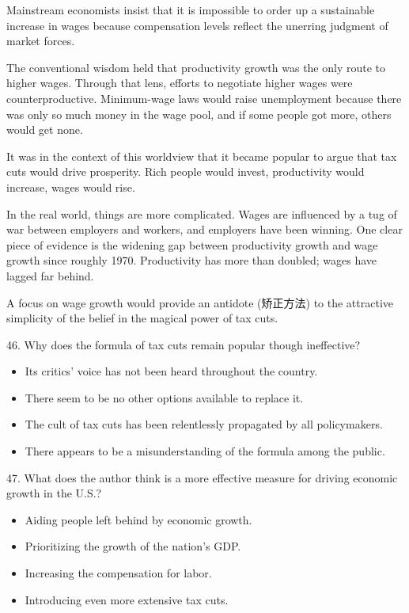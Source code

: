 \documentclass[UTF8,11pt]{ctexart}
\begin{document}
Mainstream economists insist that it is impossible to order up a sustainable increase in wages because compensation levels reflect the unerring judgment of market forces.


The conventional wisdom held that productivity growth was the only route to higher wages. Through that lens, efforts to negotiate higher wages were counterproductive. Minimum-wage laws would raise unemployment because there was only so much money in the wage pool, and if some people got more, others would get none.


It was in the context of this worldview that it became popular to argue that tax cuts would drive prosperity. Rich people would invest, productivity would increase, wages would rise.


In the real world, things are more complicated. Wages are influenced by a tug of war between employers and workers, and employers have been winning. One clear piece of evidence is the widening gap between productivity growth and wage growth since roughly 1970. Productivity has more than doubled; wages have lagged far behind.


A focus on wage growth would provide an antidote (矫正方法) to the attractive simplicity of the belief in the magical power of tax cuts.


46. Why does the formula of tax cuts remain popular though ineffective?


\begin{itemize}[leftmargin=2em,itemsep=.2em,topsep=.4em]\item[A.] Its critics’ voice has not been heard throughout the country.
\item[B.] There seem to be no other options available to replace it.
\item[C.] The cult of tax cuts has been relentlessly propagated by all policymakers.
\item[D.] There appears to be a misunderstanding of the formula among the public.
\end{itemize}

47. What does the author think is a more effective measure for driving economic growth in the U.S.?


\begin{itemize}[leftmargin=2em,itemsep=.2em,topsep=.4em]\item[A.] Aiding people left behind by economic growth.
\item[B.] Prioritizing the growth of the nation’s GDP.
\item[C.] Increasing the compensation for labor.
\item[D.] Introducing even more extensive tax cuts.
\end{itemize}
\end{document}
